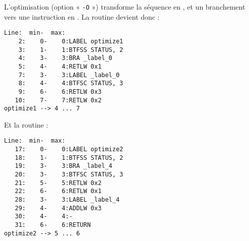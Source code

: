L'optimisation (option « \texttt{-O} ») transforme la séquence  en , et un branchement vers une instruction  en . La routine  devient donc :

\begin{lstlisting}[language=assembleur, frame=l]
 Line:  min-  max:
    2:    0-    0:LABEL optimize1
    3:    1-    1:BTFSS STATUS, 2
    4:    3-    3:BRA _label_0
    5:    4-    4:RETLW 0x1
    7:    3-    3:LABEL _label_0
    8:    4-    4:BTFSC STATUS, 3
    9:    6-    6:RETLW 0x3
   10:    7-    7:RETLW 0x2
optimize1 --> 4 ... 7
\end{lstlisting}


Et la routine  :

\begin{lstlisting}[language=assembleur, frame=l]
 Line:  min-  max:
   17:    0-    0:LABEL optimize2
   18:    1-    1:BTFSS STATUS, 2
   19:    3-    3:BRA _label_4
   20:    3-    3:BTFSC STATUS, 3
   21:    5-    5:RETLW 0x2
   22:    6-    6:RETLW 0x1
   28:    3-    3:LABEL _label_4
   29:    4-    4:ADDLW 0x3
   30:    4-    4:-
   31:    6-    6:RETURN
optimize2 --> 5 ... 6
\end{lstlisting}


